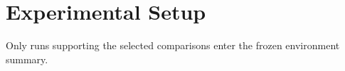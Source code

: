 \section{Experimental Setup}
Only runs supporting the selected comparisons enter the frozen environment summary.

